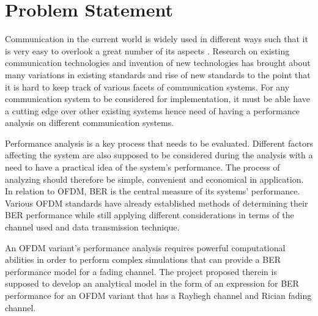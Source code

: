 
\section{Problem Statement}
Communication in the current world is widely used in different ways such that it is very easy to overlook a great number of its aspects \cite{hayk}. Research on existing communication technologies and invention of new technologies has brought about many variations in existing standards and rise of new standards to the point that it is hard to keep track of various facets of communication systems. For any communication system to be considered for implementation, it must be able have a cutting edge over other existing systems hence need of having a performance analysis on different communication systems.
 
Performance analysis is a key process that needs to be evaluated. Different factors affecting the system are also supposed to be considered during the analysis with a need to have a practical idea of the system's performance. The process of analyzing should therefore be simple, convenient and economical in application. In relation to \gls{OFDM}, \gls{BER} is the central measure of its systems' performance. Various  \gls{OFDM} standards have already established methods of determining their \gls{BER} performance while still applying different considerations in terms of the channel used and data transmission technique. 

An \gls{OFDM} variant's performance analysis requires powerful computational abilities in order to perform complex simulations that can provide a \gls{BER} performance model for a fading channel. The project proposed therein is supposed to develop an analytical model in the form of an expression for \gls{BER} performance for an \gls{OFDM} variant that has a Rayliegh channel and Rician fading channel.  